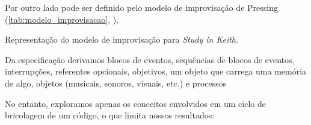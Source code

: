 Por outro lado  pode ser definido pelo modelo de improvisação de Pressing (\autoref{tab:modelo_improvisacao}, \pageref{tab:modelo_improvisacao}).


\begin{example}{Representação do modelo de improvisação para \emph{Study in Keith}.}

Da especificação  derivamos blocos de eventos, sequências de blocos de eventos, interrupções, referentes opcionais, objetivos, um objeto que carrega uma memória de algo, objetos (musicais, sonoros, visuais, etc.) e processos

\end{example}

No entanto, exploramos apenas os conceitos envolvidos em um ciclo de bricolagem de um código, o que limita nossos resultados:

